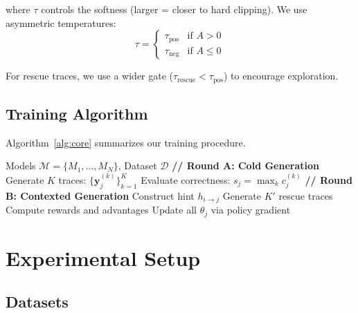 \documentclass[11pt]{article}
\newcommand{\methodname}{CoRe}
\begin{document}
where $\tau$ controls the softness (larger = closer to hard clipping). We use asymmetric temperatures:
\begin{equation}
    \tau = \begin{cases}
        \tau_{\text{pos}} & \text{if } A > 0 \\
        \tau_{\text{neg}} & \text{if } A \leq 0
    \end{cases}
\end{equation}

For rescue traces, we use a wider gate ($\tau_{\text{rescue}} < \tau_{\text{pos}}$) to encourage exploration.

\subsection{Training Algorithm}

Algorithm~\ref{alg:core} summarizes our training procedure.

\begin{algorithm}[t]
\caption{\methodname{} Training}
\label{alg:core}
\begin{algorithmic}[1]
\REQUIRE Models $\mathcal{M} = \{M_1, \ldots, M_N\}$, Dataset $\mathcal{D}$
            \STATE \textbf{// Round A: Cold Generation}
                \STATE Generate $K$ traces: $\{\mathbf{y}_j^{(k)}\}_{k=1}^K$
                \STATE Evaluate correctness: $s_j = \max_k c_j^{(k)}$
            \ENDFOR
            \STATE \textbf{// Round B: Contexted Generation}
                    \STATE Construct hint $h_{i \rightarrow j}$
                    \STATE Generate $K'$ rescue traces
                \ENDIF
            \ENDFOR
            \STATE Compute rewards and advantages
        \ENDFOR
        \STATE Update all $\theta_j$ via policy gradient
    \ENDFOR
\ENDFOR
\end{algorithmic}
\end{algorithm}

\section{Experimental Setup}

\subsection{Datasets}
\end{document}
